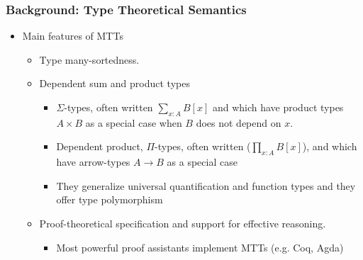 \documentclass[11pt]{beamer}
\begin{document}
\begin{frame}[fragile]
	\frametitle{Background: Type Theoretical Semantics}
	
	\begin{itemize}
		\item Main features of MTTs
		
			\begin{itemize}
				\item  Type many-sortedness.
				
				\item Dependent sum and product types
				
				\begin{itemize}
					\item  $\Sigma$-types, often written
					$\sum_{x:A}B[x]$ and which have product types $A\times B$ as a
					special case when $B$ does not depend on $x$.
					
					\item Dependent product, $\Pi$-types, often written
					($\prod_{x:A}B[x]$), and which have arrow-types $A\to B$ as a
					special case
					
					\item They generalize universal quantification and function types and they offer type polymorphism
					
					\end{itemize}
				
				\item Proof-theoretical specification and support for effective
				reasoning.
				
					\begin{itemize}
						\item Most powerful proof assistants implement MTTs (e.g. Coq, Agda)
		
		
\end{itemize}\end{itemize}\end{itemize}
\end{frame}		
\end{document}
